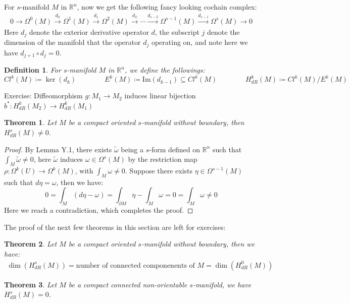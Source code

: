 \documentclass[11pt,oneside]{book}
\theoremstyle{break}
\theoremstyle{break}
\newtheorem{thm}{Theorem}[section]
\newtheorem{defn}{Definition}[corL]
\newcommand{\R}{\mathbb{R}}
\newcommand{\that}[1]{\widetilde{#1}}
\newcommand{\txtarrow}[1]{\xrightarrow{\text{#1}}}
\newcommand{\exercise}{\color{green}Exercise: \color{black}}
\begin{document}
For $s$-manifold $M$ in $\R^n$, now we get the following fancy looking cochain complex:
\begin{align*}
0 \to \Omega^0(M) \txtarrow{$d_0$}  \Omega^1 (M) \txtarrow{$d_1$} \Omega^2(M)\txtarrow{$d_2$} \cdots \txtarrow{$d_{s-2}$} \Omega^{s-1}(M) \txtarrow{$d_{s-1}$} \Omega^s(M) \to 0
\end{align*}
Here $d_j$ denote the exterior derivative operator $d$, the subscript $j$ denote the dimension of the manifold that the operator $d_j$ operating on, and note here we have $d_{j+1}\circ d_j = 0$.\\
\begin{defn}
For $s$-manifold $M$ in $\R^n$, we define the followings:
$$Cl^k(M) \coloneqq \ker(d_k) \qquad\qquad 
E^k(M) \coloneqq \text{Im}(d_{k-1}) \subseteq Cl^k(M)\qquad\qquad 
H^k_{dR}(M) \coloneqq Cl^k(M) / E^k(M)$$
\end{defn}
\exercise Diffeomorphism $g:M_1 \to M_2$ induces linear bijection $b^*:H_{dR}^k(M_2) \to H_{dR}^k(M_1)$

\begin{thm}
Let $M$ be a compact oriented $s$-manifold without boundary, then $H_{dR}^s(M) \neq 0$. 
\end{thm}
\begin{proof}
By Lemma Y.1, there exists $\that{\omega}$ being a $s$-form defined on $\R^n$ such that $\int_M \that{\omega}\neq 0$, here $\that{\omega}$ induces $\omega \in \Omega^s(M)$ by the restriction map $\rho :\Omega^k(U)\to \Omega^k(M)$, with $\int_M \omega \neq 0$. 
Suppose there exists $\eta \in \Omega^{s-1}(M)$ such that $d\eta = \omega$, then we have:
$$0 =\int_M (d\eta - \omega) = \int_{\partial M}\eta - \int_M \omega = 0 =\int_M \omega  \neq 0$$
Here we reach a contradiction, which completes the proof.
\end{proof}

The proof of the next few theorems in this section are left for exercises:

\begin{thm}
Let $M$ be a compact oriented $s$-manifold without boundary, then we have:
\begin{align*}
\dim(H_{dR}^s (M) )= \text{number of connected componenents of }M = \dim(H_{dR}^0 (M))
\end{align*}
\end{thm}


\begin{thm}
Let $M$ be a compact connected non-orientable $s$-manifold, we have $H_{dR}^s(M) = 0$.
\end{thm}
\end{document}
